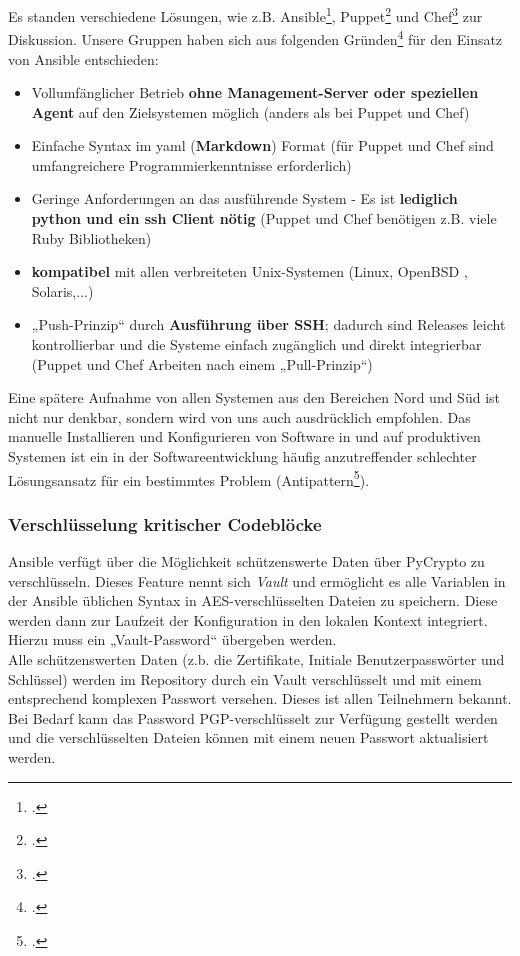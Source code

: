 Es standen verschiedene Lösungen, wie z.B. Ansible\footcite{ansible}, Puppet\footcite{puppet} und Chef\footcite{chef} zur Diskussion. Unsere Gruppen haben sich aus folgenden Gründen\footcite{whyAnsible} für den Einsatz von Ansible entschieden:

\begin{itemize}
\item Vollumfänglicher Betrieb \textbf{ohne Management-Server oder speziellen Agent} auf den Zielsystemen möglich (anders als bei Puppet und Chef)
\item Einfache Syntax im yaml (\textbf{Markdown}) Format
(für Puppet und Chef sind umfangreichere Programmierkenntnisse erforderlich)
\item Geringe Anforderungen an das ausführende System - Es ist \textbf{lediglich python und ein ssh Client nötig} (Puppet und Chef benötigen z.B. viele Ruby Bibliotheken)
\item \textbf{kompatibel} mit allen verbreiteten Unix-Systemen (Linux, OpenBSD , Solaris,...)
\item „Push-Prinzip“ durch \textbf{Ausführung über SSH}; dadurch sind Releases leicht kontrollierbar und die Systeme einfach zugänglich und direkt integrierbar
(Puppet und Chef Arbeiten nach einem „Pull-Prinzip“)
\end{itemize}

Eine spätere Aufnahme von allen Systemen aus den Bereichen Nord und Süd ist nicht nur denkbar, sondern wird von uns auch ausdrücklich empfohlen. Das manuelle Installieren und Konfigurieren von Software in und auf produktiven Systemen ist ein in der Softwareentwicklung häufig anzutreffender schlechter Lösungsansatz für ein bestimmtes Problem (Antipattern\footcite[S. 5-9]{humble2010continuous}).

\subsubsection{Verschlüsselung kritischer Codeblöcke}
\label{subsubsec:vault}
Ansible verfügt über die Möglichkeit schützenswerte Daten über PyCrypto zu verschlüsseln. Dieses Feature nennt sich \emph{Vault} und ermöglicht es alle Variablen in der Ansible üblichen Syntax in AES-verschlüsselten Dateien zu speichern. Diese werden dann zur Laufzeit der Konfiguration in den lokalen Kontext integriert. Hierzu muss ein „Vault-Password“ übergeben werden. \\

Alle schützenswerten Daten (z.b. die Zertifikate, Initiale Benutzerpasswörter und Schlüssel) werden im Repository durch ein Vault verschlüsselt und mit einem entsprechend komplexen Passwort versehen. Dieses ist allen Teilnehmern bekannt. Bei Bedarf kann das Password PGP-verschlüsselt zur Verfügung gestellt werden und die verschlüsselten Dateien können mit einem neuen Passwort aktualisiert werden.


